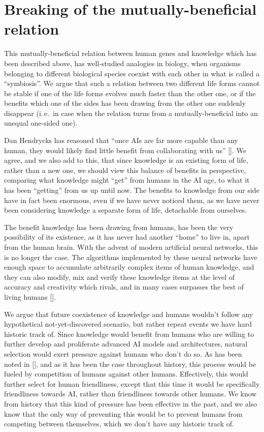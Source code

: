 \documentclass[12pt]{article}
\newcommand{\citestrut}[1]{\vphantom{[}{#1}\vphantom{]}}
\renewcommand{\cite}[1]{[\hyperlink{#1}{\citestrut{#1}}]}
\begin{document}
\section{Breaking of the mutually-beneficial relation}

This mutually-beneficial relation between human genes and knowledge which has been
described above, has well-studied analogies in biology, when organisms belonging to
different biological species coexist with each other in what is called a ``symbiosis''.
We argue that such a relation between two different life forms cannot be stable if one of
the life forms evolves much faster than the other one, or if the benefits which one of
the sides has been drawing from the other one suddenly disappear (i.\,e.\ in case when
the relation turns from a mutually-beneficial into an unequal one-sided one).

Dan Hendrycks has reasoned that ``once AIs are far more capable than any human, they
would likely find little benefit from collaborating with us'' \cite{NaturalSelection}. We
agree, and we also add to this, that since knowledge is an existing form of life, rather
than a new one, we should view this balance of benefits in perspective, comparing what
knowledge might ``get'' from humans in the AI age, to what it has been ``getting'' from
us up until now. The benefits to knowledge from our side have in fact been enormous, even
if we have never noticed them, as we have never been considering knowledge a separate
form of life, detachable from ourselves.

The benefit knowledge has been drawing from humans, has been the very possibility of its
existence, as it has never had another ``home'' to live in, apart from the human brain.
With the advent of modern artificial neural networks, this is no longer the case. The
algorithms implemented by these neural networks have enough space to accumulate
arbitrarily complex items of human knowledge, and they can also modify, mix and verify
these knowledge items at the level of accuracy and creativity which rivals, and in many
cases surpasses the best of living humans \cite{IMO}.

We argue that future coexistence of knowledge and humans wouldn't follow any hypothetical
not-yet-discovered scenario, but rather repeat events we have hard historic track of.
Since knowledge would benefit from humans who are willing to further develop and
proliferate advanced AI models and architectures, natural selection would exert pressure
against humans who don't do so. As has been noted in \cite{NaturalSelection}, and as it
has been the case throughout history, this process would be fueled by competition of
humans against other humans. Effectively, this would further select for human
friendliness, except that this time it would be specifically friendliness towards AI,
rather than friendliness towards other humans. We know from history that this kind of
pressure has been effective in the past, and we also know that the only way of preventing
this would be to prevent humans from competing between themselves, which we don't have
any historic track of.
\end{document}
